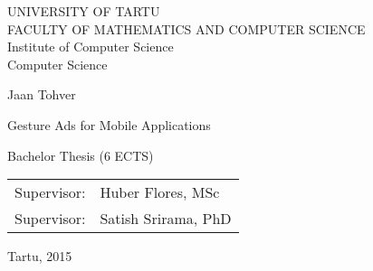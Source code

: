 \begin{titlepage}

\begin{center}

\large
UNIVERSITY OF TARTU\\[2mm]

\uppercase{Faculty of Mathematics and Computer Science}\\[2mm]
Institute of Computer Science\\
Computer Science\\[2mm]

\vspace{25mm}


\Large Jaan Tohver

\vspace{4mm}

\huge Gesture Ads for Mobile Applications

\vspace{20mm}

\Large Bachelor Thesis (6 ECTS)

\end{center}

\vspace{2mm}

\begin{flushright}
 {
 \setlength{\extrarowheight}{5pt}
 \begin{tabular}{r l} 
  \sffamily Supervisor: & \sffamily Huber Flores, MSc \\
  \sffamily Supervisor: & \sffamily Satish Srirama, PhD
 \end{tabular}
 }
\end{flushright}

\vfill

\centerline{Tartu, 2015}

\end{titlepage}